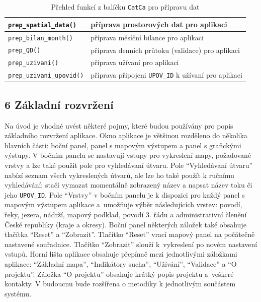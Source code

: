 \documentclass[12pt,]{article}
\begin{document}
\begin{table}[H]
\centering
\begin{tabular}{|l|l|}
\hline
\texttt{prep\_spatial\_data()}   & příprava prostorových dat pro aplikaci                     \\ \hline
\texttt{prep\_bilan\_month()}    & příprava měsíční bilance pro aplikaci                      \\ \hline
\texttt{prep\_QD()}             & příprava denních průtoku (validace) pro aplikaci  \\ \hline
\texttt{prep\_uzivani()}        & příprava užívaní pro aplikaci                              \\ \hline
\texttt{prep\_uzivani\_upovid()} & příprava připojeni \texttt{UPOV\_ID} k užívaní pro aplikaci \\ \hline
\end{tabular}
\caption{Přehled funkcí z balíčku \texttt{CatCa} pro přípravu dat}
\label{tab8}
\end{table}

\subsection{6 Základní rozvržení}\label{zakladni-rozvrzeni}

\qquad Na úvod je vhodné uvést některé pojmy, které budou používány pro
popis základního rozvržení aplikace. Okno aplikace je většinou rozděleno
do několika hlavních části: boční panel, panel s mapovým výstupem a
panel s grafickými výstupy. V bočním panelu se nastavují vstupy pro
vykreslení mapy, požadované vrstvy a lze také použit pole pro
vyhledávaní útvaru. Pole \enquote{Vyhledávaní útvaru} nabízí seznam
všech vykreslených útvarů, ale lze ho také použít k ručnímu vyhledávání;
stačí vymazat momentálně zobrazený název a napsat název toku či jeho
\texttt{UPOV\_ID}. Pole \enquote{Vrstvy} v bočním panelu je k dispozici
pro každý panel s mapovým výstupem aplikace a~umožňuje výběr
následujících vrstev: povodí, řeky, jezera, nádrží, mapový podklad,
povodí 3. řádu a administrativní členění České republiky (kraje a
okresy). Boční panel některých záložek také obsahuje tlačítka
\enquote{Reset} a \enquote{Zobrazit}. Tlačítko \enquote{Reset} vrací
mapový panel na počátečně nastavené souřadnice. Tlačítko
\enquote{Zobrazit} slouží k~vykreslení po novém nastavení vstupů. Horní
lišta aplikace obsahuje přepínač mezi jednotlivými záložkami aplikace:
\enquote{Základní mapa}, \enquote{Indikátory sucha}, \enquote{Užívání},
\enquote{Validace} a \enquote{O projektu}. Záložka \enquote{O projektu}
obsahuje krátký popis projektu a~veškeré kontakty. V budoucnu bude
rozšířena o metodiky k jednotlivým součástem systému.
\end{document}
